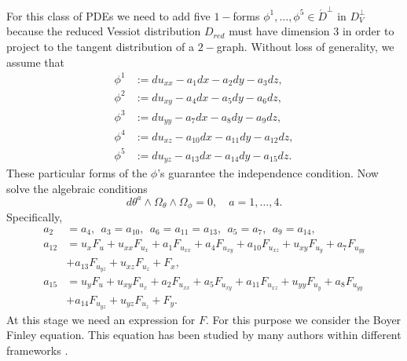 \documentclass[a4paper, 11pt]{amsart}
\theoremstyle{definition}
\begin{document}
For this class of PDEs we need to add five $1-$forms $\phi^1,\ldots,\phi^5\in \acute{D}^{\bot}$ in $D^{\perp}_V$ because the reduced Vessiot distribution $D_{red}$ must have dimension $3$ in order to project to the tangent distribution of a $2-$graph. Without loss of generality, we assume that
\begin{align}\label{eqn:phi1,2}
\phi^1&:=du_{xx}-a_{1} dx-a_{2}dy-a_{3}dz,\nonumber\\
\phi^2&:=du_{xy}-a_{4}dx-a_{5}dy-a_{6}dz,\nonumber\\
\phi^3&:=du_{yy}-a_{7}dx-a_{8}dy-a_{9}dz,\\
\phi^4&:=du_{xz}-a_{10}dx-a_{11}dy-a_{12}dz,\nonumber\\
\phi^5&:=du_{yz}-a_{13}dx-a_{14}dy-a_{15}dz.\nonumber
\end{align}
These particular forms of the $\phi$'s guarantee the independence condition.  Now solve the algebraic conditions
\[d\theta^a\wedge\Omega_\theta\wedge\Omega_\phi=0,\quad a=1,\ldots,4.\]
Specifically,
\begin{align}
  a_2&=a_4,~~a_3=a_{10},~~a_6=a_{11}=a_{13},~~a_5=a_7,~~a_9=a_{14},\nonumber\\
  a_{12}&=u_xF_u+u_{xx}F_{u_x}+a_1F_{u_{xx}}+a_4F_{u_{xy}}+a_{10}F_{u_{xz}}+u_{xy}F_{u_y}+a_{7}F_{u_{yy}}\nonumber\\&+a_{13}F_{u_{yz}}+u_{xz}F_{u_{z}}+F_x,\label{3PDE:alg sol}\\
 a_{15}&=u_yF_u+u_{xy}F_{u_x}+a_2F_{u_{xx}}+a_5F_{u_{xy}}+a_{11}F_{u_{xz}}+u_{yy}F_{u_y}+a_{8}F_{u_{yy}}\nonumber\\&+a_{14}F_{u_{yz}}+u_{yz}F_{u_{z}}+F_y.\nonumber
\end{align}
At this stage we need an expression for $F.$ For this purpose we consider the Boyer Finley equation. This equation has been studied by many authors within different frameworks \cite{Dunajski2001,Sergey,boyereq,Martina2001,ward1990}.
\end{document}
